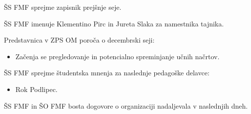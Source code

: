 \documentclass{seja}
\begin{document}
\begin{ad}
    \item
    \begin{sklep*}
        ŠS FMF sprejme zapisnik prejšnje seje.
    \end{sklep*}
  \item
  \begin{sklep*}
    ŠS FMF imenuje Klementino Pirc in Jureta Slaka za namestnika tajnika.
  \end{sklep*}
  \item
  Predstavnica v ZPS OM poroča o decembrski seji:
  \begin{itemize}
    \item
    Začenja se pregledovanje in potencialno spreminjanje učnih načrtov.
  \end{itemize}

    \item
    \begin{sklep*}
    ŠS FMF sprejme študentska mnenja za naslednje pedagoške delavce:
        \begin{itemize}
            \item
            Rok Podlipec.
        \end{itemize}
    \end{sklep*}
    \item
    ŠS FMF in ŠO FMF bosta dogovore o organizaciji nadaljevala v naslednjih dneh.


\end{ad}
\end{document}
